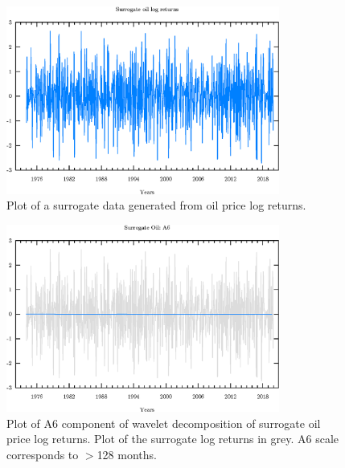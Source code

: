 \begin{figure}
\begin{center}
\includegraphics[width=0.8\textwidth]{./code/plot/surrogate_oil_logret.eps}
\caption{Plot of a surrogate data generated from oil price log returns.}
\label{fig:s-oil-logret}
\end{center}
\end{figure}


\begin{figure}
\begin{center}
\includegraphics[width=0.8\textwidth]{./code/plot/surrogate_oil_wr_A6.eps}
\caption{Plot of A6 component of wavelet decomposition of surrogate oil price log returns. 
	Plot of the surrogate log returns in grey. A6 scale corresponds to $>$128 months.}
\end{center}
\label{fig:s-oil-wr-a6}
\end{figure}


